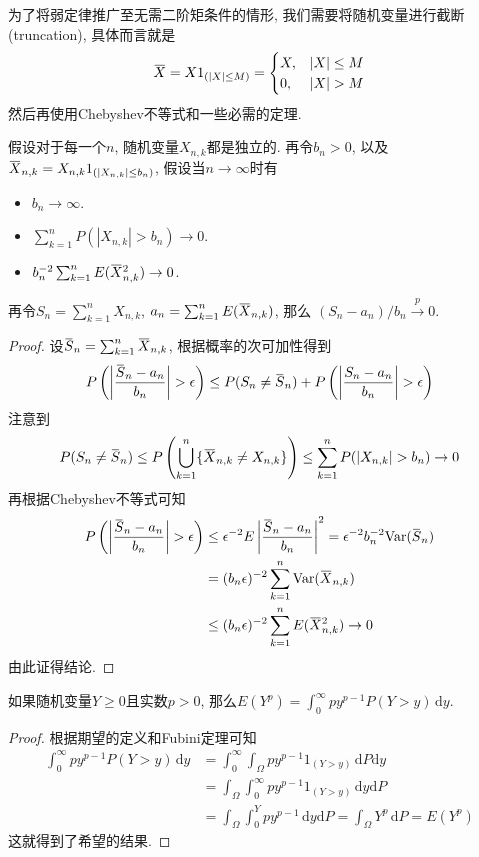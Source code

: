 \documentclass[cn, 12pt, math=mtpro2, bibstyle=apa, blue, twocol]{elegantbook}
\newcommand{\overbar}[1]{\mkern 1.5mu\overline{\mkern-1.5mu#1\mkern-1.5mu}\mkern 1.5mu}
\begin{document}
为了将弱定律推广至无需二阶矩条件的情形, 我们需要将随机变量进行截断 (truncation), 具体而言就是
$$\overbar{X}=X1_{(|X|\leq M)}=\begin{cases}
                                 X, & |X|\leq M \\
                                 0, & |X|>M
                               \end{cases}$$
然后再使用Chebyshev不等式和一些必需的定理.
\begin{theorem}[三角阵列的弱定律]\label{thm:thm2.7}
  假设对于每一个$n$, 随机变量$X_{n,k}$都是独立的. 再令$b_n>0$, 以及$\overbar{X}_{n,k}=X_{n,k}1_{(|X_{n,k}|\leq b_n)}$, 假设当$n\to\infty$时有
  \begin{itemize}
    \item $b_n\to\infty$.
    \item $\sum_{k=1}^{n}P(|X_{n,k}|>b_n)\to0$.
    \item $b_n^{-2}\sum_{k=1}^{n}E(\overbar{X}_{n,k}^2)\to0$.
  \end{itemize}
  再令$S_n=\sum_{k=1}^{n}X_{n,k}$, $a_n=\sum_{k=1}^{n}E(\overbar{X}_{n,k})$, 那么
  $(S_n-a_n)/b_n\xrightarrow{p}0$.
\end{theorem}
\begin{proof}
  设$\overbar{S}_n=\sum_{k=1}^{n}\overbar{X}_{n,k}$, 根据概率的次可加性得到
  $$P\left(\left|\frac{\overbar{S}_n-a_n}{b_n}\right|>\epsilon\right)\leq P(S_n\neq\overbar{S}_n)+P\left(\left|\frac{S_n-a_n}{b_n}\right|>\epsilon\right)$$
  注意到
  $$P(S_n\neq\overbar{S}_n)\leq P\left(\bigcup_{k=1}^n \{\overbar{X}_{n,k}\neq X_{n,k}\}\right)\leq \sum_{k=1}^{n}P(|X_{n,k}|>b_n)\to0$$
  再根据Chebyshev不等式可知
  \begin{align*}
  P\left(\left|\frac{\overbar{S}_n-a_n}{b_n}\right|>\epsilon\right)&\leq \epsilon^{-2}E\left|\frac{\overbar{S}_n-a_n}{b_n}\right|^2=\epsilon^{-2}b_n^{-2}\text{Var}(\overbar{S}_n) \\
  &=(b_n\epsilon)^{-2}\sum_{k=1}^{n}\text{Var}(\overbar{X}_{n,k}) \\
  &\leq (b_n\epsilon)^{-2}\sum_{k=1}^{n}E(\overbar{X}_{n,k}^2)\to0
  \end{align*}
  由此证得结论.
\end{proof}
\begin{lemma}\label{lem:lem2.2}
如果随机变量$Y\ge0$且实数$p>0$, 那么$E(Y^p)=\int_{0}^{\infty}py^{p-1}P(Y>y)\,\text{d}y$.
\end{lemma}
\begin{proof}
  根据期望的定义和Fubini定理可知
  \begin{align*}
  \int_{0}^{\infty}py^{p-1}P(Y>y)\,\text{d}y&=\int_{0}^{\infty}\int_{\Omega}py^{p-1}1_{(Y>y)}\,\text{d}P\text{d}y \\
  &=\int_\Omega\int_{0}^{\infty}py^{p-1}1_{(Y>y)}\,\text{d}y\text{d}P \\
  &=\int_\Omega\int_{0}^{Y}py^{p-1}\,\text{d}y\text{d}P=\int_\Omega Y^p\,\text{d}P=E(Y^p)
  \end{align*}
  这就得到了希望的结果.
\end{proof}
\end{document}
